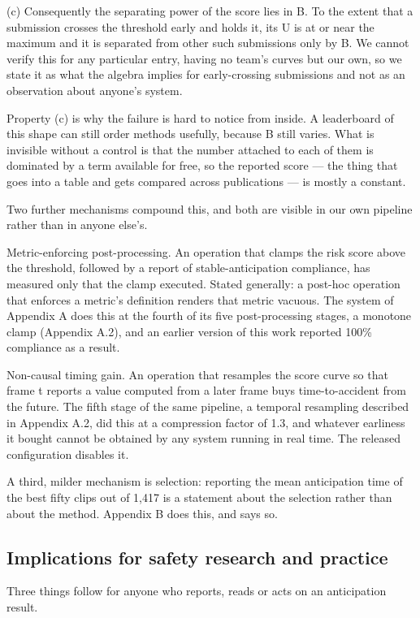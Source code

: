 (c) Consequently the separating power of the score lies in B. To the extent that a submission crosses the threshold early and holds it, its U is at or near the maximum and it is separated from other such submissions only by B. We cannot verify this for any particular entry, having no team's curves but our own, so we state it as what the algebra implies for early-crossing submissions and not as an observation about anyone's system.

Property (c) is why the failure is hard to notice from inside. A leaderboard of this shape can still order methods usefully, because B still varies. What is invisible without a control is that the number attached to each of them is dominated by a term available for free, so the reported score --- the thing that goes into a table and gets compared across publications --- is mostly a constant.

Two further mechanisms compound this, and both are visible in our own pipeline rather than in anyone else's.

Metric-enforcing post-processing. An operation that clamps the risk score above the threshold, followed by a report of stable-anticipation compliance, has measured only that the clamp executed. Stated generally: a post-hoc operation that enforces a metric's definition renders that metric vacuous. The system of Appendix A does this at the fourth of its five post-processing stages, a monotone clamp (Appendix A.2), and an earlier version of this work reported 100\% compliance as a result.

Non-causal timing gain. An operation that resamples the score curve so that frame t reports a value computed from a later frame buys time-to-accident from the future. The fifth stage of the same pipeline, a temporal resampling described in Appendix A.2, did this at a compression factor of 1.3, and whatever earliness it bought cannot be obtained by any system running in real time. The released configuration disables it.

A third, milder mechanism is selection: reporting the mean anticipation time of the best fifty clips out of 1,417 is a statement about the selection rather than about the method. Appendix B does this, and says so.


\subsection{Implications for safety research and practice}

Three things follow for anyone who reports, reads or acts on an anticipation
result.


